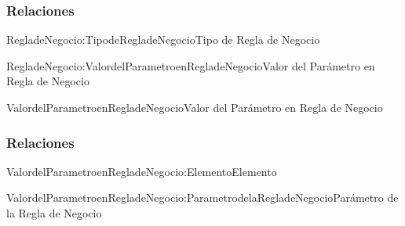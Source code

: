 \subsubsection{Relaciones}

\begin{BusinessFact}{RegladeNegocio:TipodeRegladeNegocio}{Tipo de Regla de Negocio}
\end{BusinessFact}

\begin{BusinessFact}{RegladeNegocio:ValordelParametroenRegladeNegocio}{Valor del Parámetro en Regla de Negocio}
\end{BusinessFact}


\begin{BusinessEntity}{ValordelParametroenRegladeNegocio}{Valor del Parámetro en Regla de Negocio}
\end{BusinessEntity}

\subsubsection{Relaciones}

\begin{BusinessFact}{ValordelParametroenRegladeNegocio:Elemento}{Elemento}
\end{BusinessFact}

\begin{BusinessFact}{ValordelParametroenRegladeNegocio:ParametrodelaRegladeNegocio}{Parámetro de la Regla de Negocio}
\end{BusinessFact}



